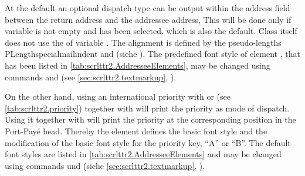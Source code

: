 %
At the default  an optional dispatch
type can be output within the
address field between the return address and the addressee address, This will
be done only if variable  is not empty and
 has been
selected, which is also the default. Class  itself does not use
the  of variable . The alignment is
defined by the pseudo-lengths PLength{specialmailindent} and
 (siehe
). The predefined
font style of element
, that has been
listed in \autoref{tab:scrlttr2.AddresseeElements}, may be changed using
commands  and  (see
\autoref{sec:scrlttr2.textmarkup},
).%
%

%
%
On the other hand, using an international priority
with  or
 (see \autoref{tab:scrlttr2.priority}) together with
 will print the priority as mode of
dispatch. Using it together with
 will print
the priority at the corresponding position in the Port-Pay\'e head. Thereby
the element  defines the basic font style and
 the modification of the basic font style for the
priority key, ``A'' or ``B''. The default font styles are listed in
\autoref{tab:scrlttr2.AddresseeElements} and may be changed using commands  und  (siehe
\autoref{sec:scrlttr2.textmarkup},
).%
%
%
%

